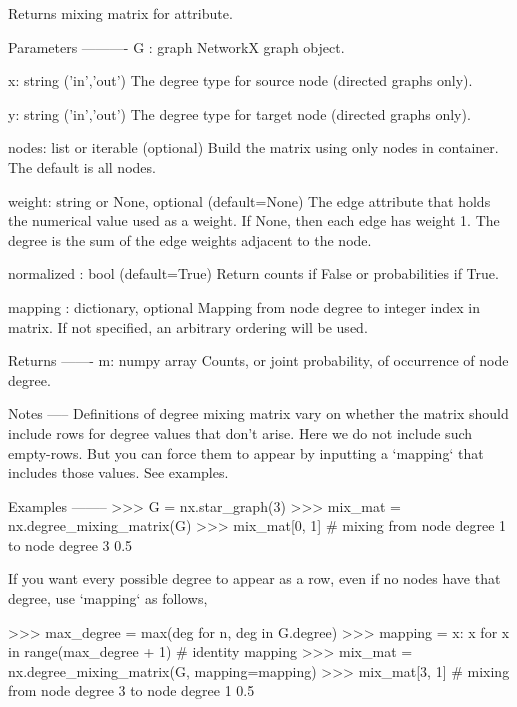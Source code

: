 \begin{DoxyVerb}Returns mixing matrix for attribute.

Parameters
----------
G : graph
   NetworkX graph object.

x: string ('in','out')
   The degree type for source node (directed graphs only).

y: string ('in','out')
   The degree type for target node (directed graphs only).

nodes: list or iterable (optional)
    Build the matrix using only nodes in container.
    The default is all nodes.

weight: string or None, optional (default=None)
   The edge attribute that holds the numerical value used
   as a weight.  If None, then each edge has weight 1.
   The degree is the sum of the edge weights adjacent to the node.

normalized : bool (default=True)
   Return counts if False or probabilities if True.

mapping : dictionary, optional
   Mapping from node degree to integer index in matrix.
   If not specified, an arbitrary ordering will be used.

Returns
-------
m: numpy array
   Counts, or joint probability, of occurrence of node degree.

Notes
-----
Definitions of degree mixing matrix vary on whether the matrix
should include rows for degree values that don't arise. Here we
do not include such empty-rows. But you can force them to appear
by inputting a `mapping` that includes those values. See examples.

Examples
--------
>>> G = nx.star_graph(3)
>>> mix_mat = nx.degree_mixing_matrix(G)
>>> mix_mat[0, 1]  # mixing from node degree 1 to node degree 3
0.5

If you want every possible degree to appear as a row, even if no nodes
have that degree, use `mapping` as follows,

>>> max_degree = max(deg for n, deg in G.degree)
>>> mapping = {x: x for x in range(max_degree + 1)} # identity mapping
>>> mix_mat = nx.degree_mixing_matrix(G, mapping=mapping)
>>> mix_mat[3, 1]  # mixing from node degree 3 to node degree 1
0.5
\end{DoxyVerb}
 \mbox{\label{namespacenetworkx_1_1algorithms_1_1assortativity_1_1mixing_ab7d7543a58b0404f8b8894ddc5966ace}} 
